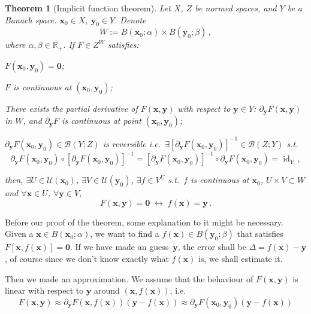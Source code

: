 \documentclass[openany]{book}
\theoremstyle{plain}
\newtheorem{theorem}{Theorem}[section] %
\theoremstyle{definition}
\newcommand*{\bv}{\boldsymbol} %
\newcommand*{\IFF}{\;\leftrightarrow\;} %
\DeclareMathOperator{\id}{id}
\begin{document}
\begin{theorem}[Implicit function theorem]
	\label{theorem: implicit function theorem}
	Let $X$, $Z$ be normed spaces, and $Y$ be a Banach space.
	$\bv x_0 \in X$, $\bv y_0 \in Y$. Denote
	\begin{equation*}
		W := B(\bv x_0; \alpha) \times B(\bv y_0; \beta)\,,
	\end{equation*}
	where $\alpha, \beta \in \mathbb R_+$.
	If $F \in Z^W$ satisfies:
	\begin{conditionlist}[label=\alph*)]
		\item $F(\bv x_0, \bv y_0) = \bv 0$;
		\item $F$ is continuous at $(\bv x_0, \bv y_0)$;
		\item There exists the partial derivative of $F(\bv x, \bv y)$ with respect to $\bv y \in Y$: $\partial_{\bv y} F(\bv x, \bv y)$ in $W$, and $\partial_{\bv y} F$ is continuous at point $(\bv x_0, \bv y_0)$;
		\item $\partial_{\bv y} F(\bv x_0, \bv y_0) \in \mathcal B(Y; Z)$ is reversible i.e.\ $\exists [\partial_{\bv y} F(\bv x_0, \bv y_0)]^{-1} \in \mathcal B(Z; Y)$ s.t.
		\begin{equation*}
			\partial_{\bv y} F(\bv x_0, \bv y_0) \circ [\partial_{\bv y} F(\bv x_0, \bv y_0)]^{-1} 
			= [\partial_{\bv y} F(\bv x_0, \bv y_0)]^{-1} \circ \partial_{\bv y} F(\bv x_0, \bv y_0) = \id_Y\,,
		\end{equation*}
	\end{conditionlist}
	then, $\exists U \in \mathscr U(\bv x_0)$, $\exists V \in \mathscr U(\bv y_0)$, $\exists f \in V^U$ s.t.\ $f$ is continuous at $\bv x_0$, $U \times V \subset W$ and $\forall \bv x \in U$, $\forall \bv y \in V$, 
	\begin{equation*}
		F(\bv x, \bv y) = \bv 0
		\IFF
		f(\bv x) = \bv y\,.
	\end{equation*}
\end{theorem}

Before our proof of the theorem, some explanation to it might be necessary. 
Given a $\bv x \in B(\bv x_0; \alpha)$, we want to find a $f(\bv x) \in B(\bv y_0; \beta)$ that satisfies $F[\bv x, f(\bv x)] = \bv 0$. 
If we have made an guess~$\bv y$, the error shall be $\Delta = f(\bv x) - \bv y$, of course since we don't know exactly what $f(\bv x)$ is, we shall estimate it.

Then we made an approximation. 
We assume that the behaviour of $F(\bv x, \bv y)$ is linear with respect to $\bv y$ around $(\bv x, f(\bv x))$, i.e.\ 
\begin{equation*}
	F(\bv x, \bv y) \approx \partial_{\bv y} F(\bv x, f(\bv x)) (\bv y - f(\bv x))
	\approx \partial_{\bv y} F(\bv x_0, \bv y_0) (\bv y - f(\bv x))
\end{equation*}
\end{document}
